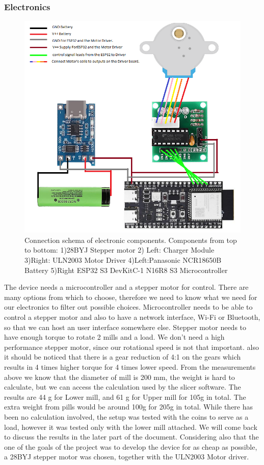 \subsubsection{Electronics}
\begin{figure}
	\centering
	\includegraphics[width=0.5\linewidth]{Figures/Motor}
	\caption[Connection schema of electronic components]{Connection schema of electronic components. Components from top to bottom: 1)28BYJ Stepper motor 2) Left: Charger Module 3)Right: ULN2003 Motor Driver 4)Left:Panasonic NCR18650B Battery 5)Right ESP32 S3 DevKitC-1 N16R8 S3 Microcontroller}
	\label{fig:motor}
\end{figure}
The device needs a microcontroller and a stepper motor for control. There are many options from which to choose, therefore we need to know what we need for our electronics to filter out possible choices. Microcontroller needs to be able to control a stepper motor and also to have a network interface, Wi-Fi or Bluetooth, so that we can host an user interface somewhere else. Stepper motor needs to have enough torque to rotate 2 mills and a load. We don't need a high performance stepper motor, since our rotational speed is not that important. also it should be noticed that there is a gear reduction of 4:1 on the gears which results in 4 times higher torque for 4 times lower speed. From the measurements above we know that the diameter of mill is 200 mm, the weight is hard to calculate, but we can access the calculation used by the slicer software. The results are 44 g for Lower mill, and 61 g for Upper mill for 105g in total. The extra weight from pills would be around 100g for 205g in total. While there has been no calculation involved, the setup was tested with the coins to serve as a load, however it was tested only with the lower mill attached. We will come back to discuss the results in the later part of the document. Considering also that the one of the goals of the project was to develop the device for as cheap as possible, a 28BYJ \cite{stepper} stepper motor was chosen, together with the ULN2003\cite{ti_uln2003a_revT_2025} Motor driver.

